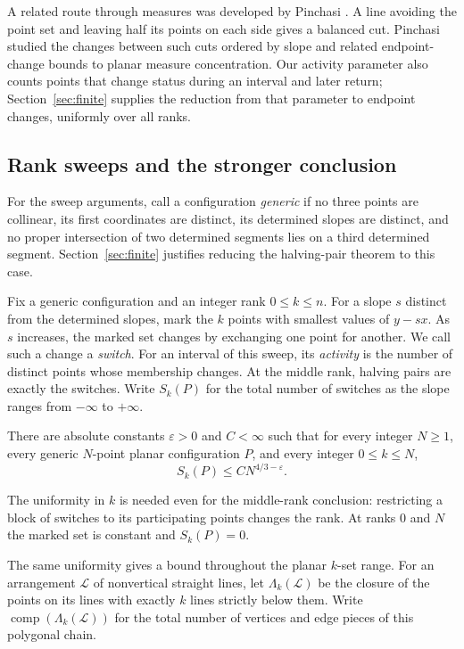 A related route through measures was developed by Pinchasi
\cite{Pinchasi2009}. A line avoiding the point set and leaving half
its points on each side gives a balanced cut. Pinchasi studied the
changes between such cuts ordered by slope and related endpoint-change
bounds to planar measure concentration. Our activity parameter also
counts points that change status during an interval and later return;
Section~\ref{sec:finite} supplies the reduction from that parameter
to endpoint changes, uniformly over all ranks.

\subsection{Rank sweeps and the stronger conclusion}
For the sweep arguments, call a configuration \emph{generic} if no three
points are collinear, its first coordinates are distinct, its determined
slopes are distinct, and no proper intersection of two determined
segments lies on a third determined segment. Section~\ref{sec:finite}
justifies reducing the halving-pair theorem to this case.

Fix a generic configuration and an integer rank $0\le k\le n$. For a slope $s$ distinct from the determined slopes, mark the
$k$ points with smallest values of
$y-sx$. As $s$ increases, the marked set changes by exchanging one
point for another. We call such a change a \emph{switch}. For an
interval of this sweep, its \emph{activity} is the number of distinct
points whose membership changes. At the middle rank, halving pairs
are exactly the switches. Write $S_k(P)$ for the total number of switches
as the slope ranges from $-\infty$ to $+\infty$.

\begin{theorem}\label{thm:all-ranks}
There are absolute constants $\varepsilon>0$ and $C<\infty$ such that
for every integer $N\ge1$, every generic $N$-point planar configuration
$P$, and every integer $0\le k\le N$,
\[
 S_k(P)\le C N^{4/3-\varepsilon}.
\]
\end{theorem}

The uniformity in $k$ is needed even for the middle-rank conclusion:
restricting a block of switches to its participating points changes the
rank. At ranks $0$ and $N$ the marked set is constant and $S_k(P)=0$.

The same uniformity gives a bound throughout the planar $k$-set range.
For an arrangement $\mathcal L$ of nonvertical straight lines, let
$\Lambda_k(\mathcal L)$ be the closure of the points on its lines with
exactly $k$ lines strictly below them. Write
$\operatorname{comp}(\Lambda_k(\mathcal L))$ for the total number of
vertices and edge pieces of this polygonal chain.

